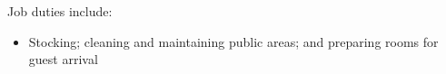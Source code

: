 \normalsize
Job duties include:
\small
\begin{itemize}
    \item Stocking; cleaning and maintaining public areas; and preparing rooms for guest arrival
\end{itemize}
\normalsize
\medskip
